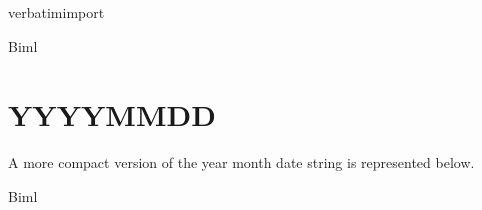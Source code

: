 verbatimimport 




Biml





\section{YYYYMMDD}
A more compact version of the year month date string is represented below. 




Biml
